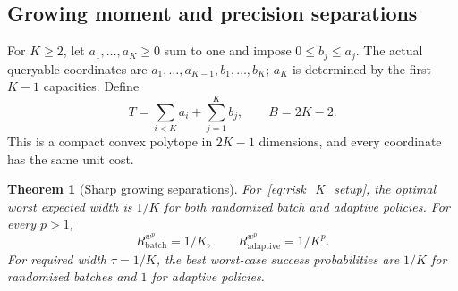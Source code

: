 \documentclass[12pt]{article}
\newtheorem{theorem}{Theorem}
\begin{document}
\subsection{Growing moment and precision separations}
\label{sec:risk_growing}
For $K\ge2$, let $a_1,\ldots,a_K\ge0$ sum to one and impose
$0\le b_j\le a_j$. The actual queryable coordinates are
$a_1,\ldots,a_{K-1},b_1,\ldots,b_K$; $a_K$ is determined by the
first $K-1$ capacities. Define
\begin{equation}
 T=\sum_{i<K}a_i+\sum_{j=1}^K b_j,\qquad B=2K-2.
 \label{eq:risk_K_setup}
\end{equation}
This is a compact convex polytope in $2K-1$ dimensions, and every
coordinate has the same unit cost.

\begin{theorem}[Sharp growing separations]
\label{prop:risk_K_family}
For~\eqref{eq:risk_K_setup}, the optimal worst expected width is $1/K$
for both randomized batch and adaptive policies. For every $p>1$,
\begin{equation}
 R_{\mathrm{batch}}^{w^p}=1/K,\qquad
 R_{\mathrm{adaptive}}^{w^p}=1/K^p.
 \label{eq:risk_K_moments}
\end{equation}
For required width $\tau=1/K$, the best worst-case success probabilities
are $1/K$ for randomized batches and $1$ for adaptive policies.
\end{theorem}
\end{document}
